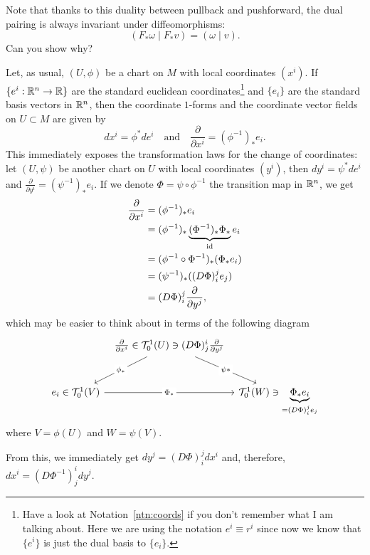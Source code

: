 Note that thanks to this duality between pullback and pushforward, the dual pairing is always invariant under diffeomorphisms:
\begin{equation}
  (F_* \omega \mid F_* v) = (\omega \mid v).
\end{equation}
Can you show why?

\begin{example}
  Let, as usual, $(U,\phi)$ be a chart on $M$ with local coordinates $(x^i)$.
  If $\{e^i:\mathbb{R}^n\to\mathbb{R}\}$ are the standard euclidean coordinates\footnote{Have a look at Notation~\ref{ntn:coords} if you don't remember what I am talking about.
  Here we are using the notation $e^i \equiv r^i$ since now we know that $\{e^i\}$ is just the dual basis to $\{e_i\}$. } and $\{e_i\}$ are the standard basis vectors in $\mathbb{R}^n$, then the coordinate $1$-forms and the coordinate vector fields on $U\subset M$ are given by
  \begin{equation}
    dx^i = \phi^* de^i
    \quad\mbox{and}\quad
    \frac{\partial}{\partial x^i} = (\phi^{-1})_* e_i.
  \end{equation}
  This immediately exposes the transformation laws for the change of coordinates: let $(U, \psi)$ be another chart on $U$ with local coordinates $(y^i)$, then $dy^i = \psi^* de^i$ and $\frac{\partial}{\partial y^i} = (\psi^{-1})_* e_i$. If we denote $\Phi = \psi\circ\phi^{-1}$ the transition map in $\mathbb{R}^n$, we get
  \begin{align}
    \frac{\partial}{\partial x^i} &= (\phi^{-1})_* e_i \\
    &= (\phi^{-1})_* \LaTeXunderbrace{(\Phi^{-1})_*\Phi_*}_{\id} e_i \\
    &= (\phi^{-1}\circ \Phi^{-1})_* (\Phi_* e_i) \\
    &= (\psi^{-1})_* ((D\Phi)_i^j e_j) \\
    &= (D\Phi)_i^j \frac{\partial}{\partial y^j},
  \end{align}
  which may be easier to think about in terms of the following diagram
  \begin{equation}\nonumber
    \begin{tikzcd}[row sep=large, column sep=tiny]
      & \frac{\partial}{\partial x^i} \in \cT_0^1(U) \ni (D\Phi)_j^i \frac{\partial}{\partial y^j} \arrow[dl, "\phi_*" description] \arrow[dr, "\psi*" description] & \\
      e_i \in \cT_0^1(V) \arrow[rr, "\Phi_*" description] & & \cT_0^1(W) \ni \LaTeXunderbrace{\Phi_* e_i}_{= (D\Phi)_i^j e_j}
    \end{tikzcd}
  \end{equation}
  where $V = \phi(U)$ and $W = \psi(V)$.

  From this, we immediately get $dy^j = (D\Phi)_i^j dx^i$ and, therefore, $dx^i =  (D\Phi^{-1})_j^i dy^j$.
\end{example}

